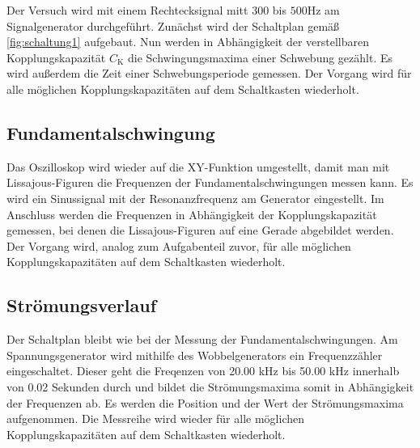 \noindent Der Versuch wird mit einem Rechtecksignal mitt $300$ bis $500 \si{\hertz}$ am Signalgenerator durchgeführt.
Zunächst wird der Schaltplan gemäß \autoref{fig:schaltung1} aufgebaut. Nun werden in Abhängigkeit der verstellbaren Kopplungskapazität $C_{\text{K}}$ die 
Schwingungsmaxima einer Schwebung gezählt. Es wird außerdem die Zeit einer Schwebungsperiode gemessen.
Der Vorgang wird für alle möglichen Kopplungskapazitäten auf dem Schaltkasten wiederholt.

\subsection{Fundamentalschwingung}
Das Oszilloskop wird wieder auf die XY-Funktion umgestellt, damit man mit Lissajous-Figuren die Frequenzen der Fundamentalschwingungen messen kann. 
Es wird ein Sinussignal mit der Resonanzfrequenz am Generator eingestellt. Im Anschluss werden die Frequenzen in Abhängigkeit der Kopplungskapazität 
gemessen, bei denen die Lissajous-Figuren auf eine Gerade abgebildet werden. Der Vorgang wird, analog zum Aufgabenteil zuvor, für alle möglichen 
Kopplungskapazitäten auf dem Schaltkasten wiederholt. 

\subsection{Strömungsverlauf}
Der Schaltplan bleibt wie bei der Messung der Fundamentalschwingungen. Am Spannungsgenerator wird mithilfe des Wobbelgenerators ein Frequenzzähler
eingeschaltet. Dieser geht die Freqenzen von 20.00 kHz bis 50.00 kHz innerhalb von 0.02 Sekunden durch und bildet die Strömungsmaxima somit in
Abhängigkeit der Frequenzen ab. Es werden die Position und der Wert der Strömungsmaxima aufgenommen. Die Messreihe wird wieder für alle
möglichen Kopplungskapazitäten auf dem Schaltkasten wiederholt.
